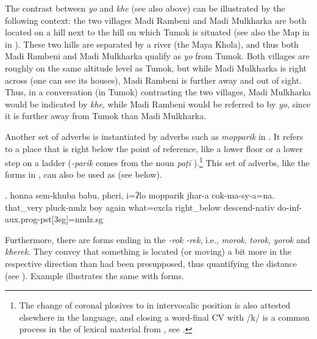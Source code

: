 The contrast between \emph{yo} and \emph{khe} (see also  above) can be illustrated by the following context: the two villages Madi Rambeni and Madi Mulkharka are both located on a hill next to the hill on which Tumok is situated (see also the Map in  in ). These two hills are separated by a river (the Maya Khola), and thus both Madi Rambeni and Madi Mulkharka qualify as \emph{yo}  from Tumok. Both villages are roughly on the same altitude level as Tumok, but while Madi Mulkharka is right across (one can see its houses), Madi Rambeni is further away and out of sight. Thus, in a conversation (in Tumok) contrasting the two villages, Madi Mulkharka would be indicated by \emph{khe}, while Madi Rambeni would be referred to by \emph{yo}, since it is further away from Tumok  than Madi Mulkharka.

Another set of adverbs is instantiated by adverbs such as \emph{mopparik}  in \Next. It refers to a place that is right below the point of reference, like a lower floor or a lower step on a ladder (\emph{-parik} comes from the  noun \emph{paṭī} ).\footnote{The change of  coronal plosives to  in intervocalic position is also attested elsewhere in the language, and closing a word-final CV  with /k/ is a common process in the  of lexical material from , see .} This set of adverbs, like the forms in \Last, can also be used  as   (see  below). 

\exg. honna              sem-khuba        babu, pheri, i=ʔlo    mopparik    jhar-a          cok-ma-sy-a=na.\\
that\_very pluck{\sc -nmlz} boy again what{\sc =excla} right\_below descend{\sc -nativ} do{\sc -inf-aux.prog-pst[3sg]=nmlz.sg} \\
 


Furthermore, there are forms ending in the  \emph{-rok \ti -rek}, i.e., \emph{morok}, \emph{torok}, \emph{yorok} and \emph{kherek}. They convey that something is located (or moving) a bit more in the respective direction than had been presupposed, thus quantifying the distance (see \Next). Example \NNext illustrates the same with  forms. 

